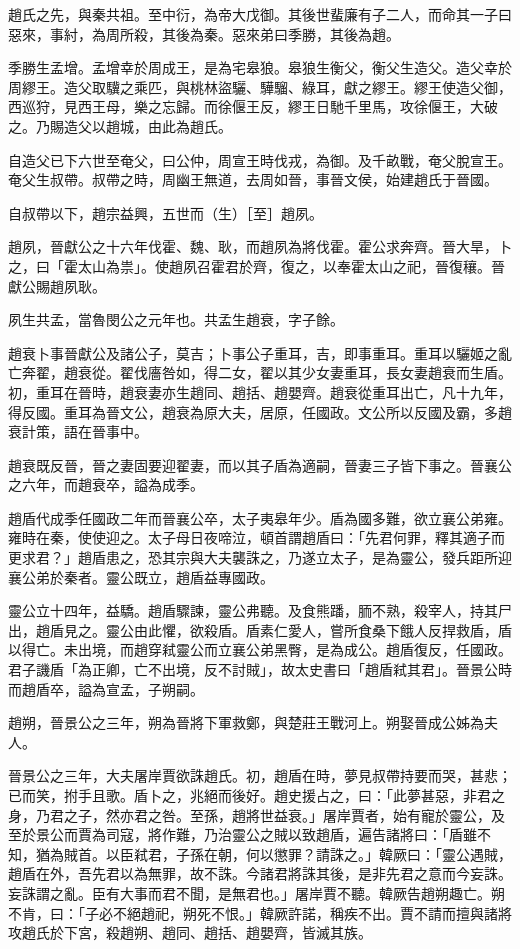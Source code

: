 
\begin{pinyinscope}
趙氏之先，與秦共祖。至中衍，為帝大戊御。其後世蜚廉有子二人，而命其一子曰惡來，事紂，為周所殺，其後為秦。惡來弟曰季勝，其後為趙。

季勝生孟增。孟增幸於周成王，是為宅皋狼。皋狼生衡父，衡父生造父。造父幸於周繆王。造父取驥之乘匹，與桃林盜驪、驊騮、綠耳，獻之繆王。繆王使造父御，西巡狩，見西王母，樂之忘歸。而徐偃王反，繆王日馳千里馬，攻徐偃王，大破之。乃賜造父以趙城，由此為趙氏。

自造父已下六世至奄父，曰公仲，周宣王時伐戎，為御。及千畝戰，奄父脫宣王。奄父生叔帶。叔帶之時，周幽王無道，去周如晉，事晉文侯，始建趙氏于晉國。

自叔帶以下，趙宗益興，五世而（生）［至］趙夙。

趙夙，晉獻公之十六年伐霍、魏、耿，而趙夙為將伐霍。霍公求奔齊。晉大旱，卜之，曰「霍太山為祟」。使趙夙召霍君於齊，復之，以奉霍太山之祀，晉復穰。晉獻公賜趙夙耿。

夙生共孟，當魯閔公之元年也。共孟生趙衰，字子餘。

趙衰卜事晉獻公及諸公子，莫吉；卜事公子重耳，吉，即事重耳。重耳以驪姬之亂亡奔翟，趙衰從。翟伐廧咎如，得二女，翟以其少女妻重耳，長女妻趙衰而生盾。初，重耳在晉時，趙衰妻亦生趙同、趙括、趙嬰齊。趙衰從重耳出亡，凡十九年，得反國。重耳為晉文公，趙衰為原大夫，居原，任國政。文公所以反國及霸，多趙衰計策，語在晉事中。

趙衰既反晉，晉之妻固要迎翟妻，而以其子盾為適嗣，晉妻三子皆下事之。晉襄公之六年，而趙衰卒，謚為成季。

趙盾代成季任國政二年而晉襄公卒，太子夷皋年少。盾為國多難，欲立襄公弟雍。雍時在秦，使使迎之。太子母日夜啼泣，頓首謂趙盾曰：「先君何罪，釋其適子而更求君？」趙盾患之，恐其宗與大夫襲誅之，乃遂立太子，是為靈公，發兵距所迎襄公弟於秦者。靈公既立，趙盾益專國政。

靈公立十四年，益驕。趙盾驟諫，靈公弗聽。及食熊蹯，胹不熟，殺宰人，持其尸出，趙盾見之。靈公由此懼，欲殺盾。盾素仁愛人，嘗所食桑下餓人反捍救盾，盾以得亡。未出境，而趙穿弒靈公而立襄公弟黑臀，是為成公。趙盾復反，任國政。君子譏盾「為正卿，亡不出境，反不討賊」，故太史書曰「趙盾弒其君」。晉景公時而趙盾卒，謚為宣孟，子朔嗣。

趙朔，晉景公之三年，朔為晉將下軍救鄭，與楚莊王戰河上。朔娶晉成公姊為夫人。

晉景公之三年，大夫屠岸賈欲誅趙氏。初，趙盾在時，夢見叔帶持要而哭，甚悲；已而笑，拊手且歌。盾卜之，兆絕而後好。趙史援占之，曰：「此夢甚惡，非君之身，乃君之子，然亦君之咎。至孫，趙將世益衰。」屠岸賈者，始有寵於靈公，及至於景公而賈為司寇，將作難，乃治靈公之賊以致趙盾，遍告諸將曰：「盾雖不知，猶為賊首。以臣弒君，子孫在朝，何以懲罪？請誅之。」韓厥曰：「靈公遇賊，趙盾在外，吾先君以為無罪，故不誅。今諸君將誅其後，是非先君之意而今妄誅。妄誅謂之亂。臣有大事而君不聞，是無君也。」屠岸賈不聽。韓厥告趙朔趣亡。朔不肯，曰：「子必不絕趙祀，朔死不恨。」韓厥許諾，稱疾不出。賈不請而擅與諸將攻趙氏於下宮，殺趙朔、趙同、趙括、趙嬰齊，皆滅其族。


\end{pinyinscope}
